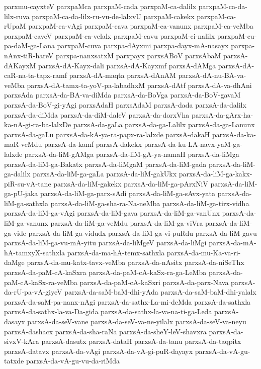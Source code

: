 {parxmu-cayxteV
parxpaMca
parxpaM-cada
parxpaM-ca-dalilx
parxpaM-ca-da-lilx-ruva
parxpaM-ca-da-lilx-ru-vu-de-lalxvU
parxpaM-cakekx
parxpaM-ca-rUpaM
parxpaM-ca-vAgi
parxpaM-cava
parxpaM-ca-vanunx
parxpaM-ca-veMba
parxpaM-caveV
parxpaM-ca-velalx
parxpaM-cavu
parxpaM-ci-nalilx
parxpaM-cu-pa-daM-ga-Lana
parxpaM-cuva
parxpa-dAyxmi
parxpa-dayx-mA-nasayx
parxpa-nAnx-tiR-hareV
parxpa-nanxsatxM
parxpayx
parxsABoV
parxsAbaM
parxsA-dAKayxM
parxsA-dA-Kayx-dali
parxsA-dA-Kayxmf
parxsA-dAMga
parxsA-dA-caR-na-ta-tapx-ramf
parxsA-dA-maqta
parxsA-dAnAM
parxsA-dA-nu-BA-va-veMba
parxsA-dA-tamx-ta-yoV-pa-labadhxM
parxsA-dAtf
parxsA-dA-va-dhAni
parxsAda
parxsA-da-BA-va-diMda
parxsA-da-BoVga
parxsA-da-BoV-gavaM
parxsA-da-BoV-gi-yAgi
parxsAdaH
parxsAdaM
parxsA-dada
parxsA-da-dalilx
parxsA-da-diMda
parxsA-da-diM-daleV
parxsA-da-dorxVha
parxsA-da-gArx-ha-ka-nA-gi-ra-ba-lalxDe
parxsA-da-gaLa
parxsA-da-ga-Lalilx
parxsA-da-ga-Lanunx
parxsA-da-gaLu
parxsA-da-kA-ya-ra-papx-ra-lalxde
parxsA-dakaH
parxsA-da-ka-maR-veMdu
parxsA-da-kamf
parxsA-dakekx
parxsA-da-ku-LA-navx-yaM-ga-lalxde
parxsA-da-liM-gAMga
parxsA-da-liM-gA-ya-namaH
parxsA-da-liMga
parxsA-da-liM-ga-Bakatx
parxsA-da-liMgaM
parxsA-da-liM-gada
parxsA-da-liM-ga-dalilx
parxsA-da-liM-ga-gaLa
parxsA-da-liM-gakUkx
parxsA-da-liM-ga-kakx-piR-su-vA-tane
parxsA-da-liM-gakekx
parxsA-da-liM-ga-pArxNiV
parxsA-da-liM-ga-pU-jaka
parxsA-da-liM-ga-parx-sAdi
parxsA-da-liM-ga-sAvx-yata
parxsA-da-liM-ga-sathxla
parxsA-da-liM-ga-sha-ra-Na-neMba
parxsA-da-liM-ga-tirx-vidha
parxsA-da-liM-ga-vAgi
parxsA-da-liM-gava
parxsA-da-liM-ga-vanUnx
parxsA-da-liM-ga-vanunx
parxsA-da-liM-ga-veMdu
parxsA-da-liM-ga-viVra
parxsA-da-liM-ga-vide
parxsA-da-liM-ga-vidudx
parxsA-da-liM-ga-vi-puRdu
parxsA-da-liM-gavu
parxsA-da-liM-ga-vu-mA-yitu
parxsA-da-liMgeV
parxsA-da-liMgi
parxsA-da-mA-hA-tamxyX-sathxla
parxsA-da-ma-hA-temx-sathxla
parxsA-da-mu-Ka-va-ri-daMge
parxsA-da-mu-katx-tavx-veMba
parxsA-da-nAsitx
parxsA-da-niSeThx
parxsA-da-paM-cA-kaSxra
parxsA-da-paM-cA-kaSx-ra-ga-LeMba
parxsA-da-paM-cA-kaSx-ra-veMba
parxsA-da-paM-cA-kaSxri
parxsA-da-parx-Nava
parxsA-da-rU-pa-vA-giyeV
parxsA-da-saM-baM-dhi-yAda
parxsA-da-saM-baM-dhi-yalalx
parxsA-da-saM-pa-nanx-nAgi
parxsA-da-sathx-La-mi-deMda
parxsA-da-sathxla
parxsA-da-sathx-la-va-Da-gida
parxsA-da-sathx-la-va-na-ti-ga-Leda
parxsA-dasayx
parxsA-da-seV-vane
parxsA-da-seV-va-ne-yilalx
parxsA-da-seV-va-neyu
parxsA-dashacx
parxsA-da-sha-raNa
parxsA-da-sheY-leV-shavxra
parxsA-da-sivxV-kAra
parxsA-dasutx
parxsA-dataH
parxsA-da-tanu
parxsA-da-taqpitx
parxsA-datavx
parxsA-da-vAgi
parxsA-da-vA-gi-puR-dayayx
parxsA-da-vA-gu-tatxde
parxsA-da-vA-gu-vu-da-riMda
}
